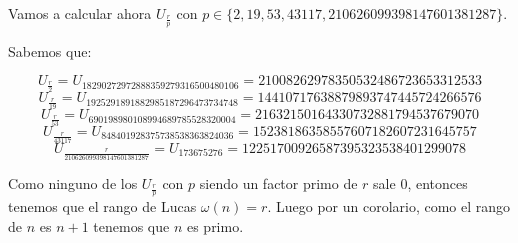 \documentclass[a4paper]{article}
\begin{document}
Vamos a calcular ahora $U_{\frac{r}{p}}$ con $p\in\{2,19,53,43117,210626099398147601381287\}$.

Sabemos que:

$$U_{\frac{r}{2}} = U_{18290272972888359279316500480106}=21008262978350532486723653312533$$
$$U_{\frac{r}{19}} = U_{1925291891882985187296473734748}=14410717638879893747445724266576$$
$$U_{\frac{r}{53}} = U_{690198980108994689785528320004}=21632150164330732881794537679070$$
$$U_{\frac{r}{43117}} = U_{848401928375738538363824036}=15238186358557607182607231645757$$
$$U_{\frac{r}{210626099398147601381287}} = U_{173675276}=12251700926587395323538401299078$$

Como ninguno de los $U_{\frac{r}{p}}$ con $p$ siendo un factor primo de $r$ sale 0, entonces tenemos que el rango de Lucas $\omega (n)=r$. Luego por un corolario, como el rango de $n$ es $n+1$ tenemos que $n$ es primo.
\end{document}

